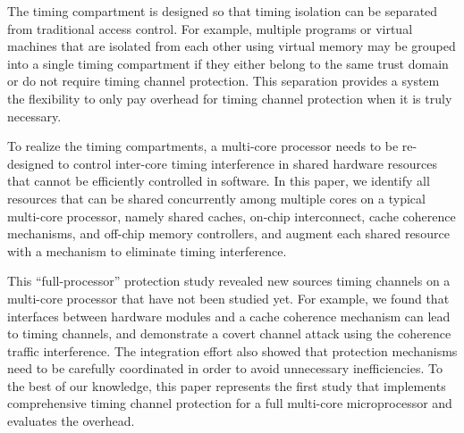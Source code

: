 The timing compartment is designed so that timing isolation can be
separated from traditional access control. For example, multiple programs or
virtual machines that are isolated from each other using virtual memory may
be grouped into a single timing compartment if they either belong to the 
same trust domain or do not require timing channel protection. 
This separation provides a system the flexibility to only pay overhead for
timing channel protection when it is truly necessary.

To realize the timing compartments, a multi-core processor needs to be
re-designed to control inter-core timing interference in shared hardware
resources that cannot be efficiently controlled in software.
In this paper, we identify all resources that can be shared concurrently among
multiple cores on a typical multi-core processor, namely shared caches,
on-chip interconnect, cache coherence mechanisms, and off-chip memory controllers,
and augment each shared resource with a mechanism
to eliminate timing interference.

This ``full-processor'' protection study revealed new sources timing
channels on a multi-core processor that have not been studied yet.
For example, we found that interfaces between hardware modules and 
a cache coherence mechanism can lead to timing channels, and demonstrate
a covert channel attack using the coherence traffic interference.
The integration effort also showed that protection mechanisms need to
be carefully coordinated in order to avoid unnecessary inefficiencies.
To the best of our knowledge, this paper represents the first study
that implements comprehensive timing channel protection for a full 
multi-core microprocessor and evaluates the overhead.



